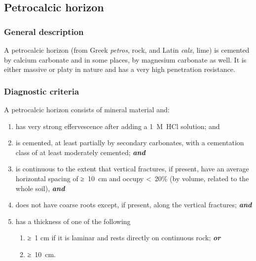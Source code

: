 \documentclass[
  letterpaper,
  DIV=11,
  numbers=noendperiod]{scrreprt}
\providecommand{\tightlist}{%
  \setlength{\itemsep}{0pt}\setlength{\parskip}{0pt}}\usepackage{longtable,booktabs,array}
\begin{document}
\hypertarget{petrocalcic-horizon}{%
\subsection{Petrocalcic horizon}\label{petrocalcic-horizon}}

\hypertarget{general-description-23}{%
\subsubsection{General description}\label{general-description-23}}

A petrocalcic horizon (from Greek \emph{petros}, rock, and Latin
\emph{calx}, lime) is cemented by calcium carbonate and in some places,
by magnesium carbonate as well. It is either massive or platy in nature
and has a very high penetration resistance.

\hypertarget{diagnostic-criteria-23}{%
\subsubsection{Diagnostic criteria}\label{diagnostic-criteria-23}}

A petrocalcic horizon consists of mineral material and:

\begin{enumerate}
\def\labelenumi{\arabic{enumi}.}
\item
  has very strong effervescence after adding a 1~M~HCl solution; and
\item
  is cemented, at least partially by secondary carbonates, with a
  cementation class of at least moderately cemented; \textbf{\emph{and}}
\item
  is continuous to the extent that vertical fractures, if present, have
  an average horizontal spacing of ≥~10~cm and occupy \textless~20\% (by
  volume, related to the whole soil), \textbf{\emph{and}}
\item
  does not have coarse roots except, if present, along the vertical
  fractures; \textbf{\emph{and}}
\item
  has a thickness of one of the following

  \begin{enumerate}
  \def\labelenumii{\alph{enumii}.}
  \tightlist
  \item
    ≥~1 cm if it is laminar and rests directly on continuous rock;
    \textbf{\emph{or}}
  \item
    ≥~10~cm.
  \end{enumerate}
\end{enumerate}
\end{document}
